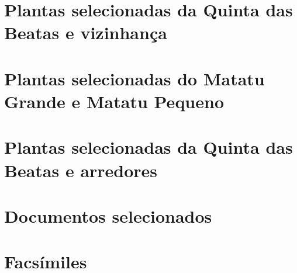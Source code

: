 \begin{anexosenv}
\chapter{Plantas selecionadas da Quinta das Beatas e vizinhança}




\chapter{Plantas selecionadas do Matatu Grande e Matatu Pequeno}




\chapter{Plantas selecionadas da Quinta das Beatas e arredores}








\chapter{Documentos selecionados}



\chapter{Facsímiles}



\end{anexosenv}